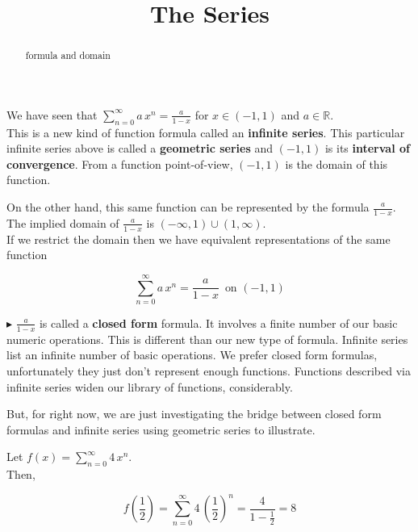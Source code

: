 \documentclass{ximera}
\title{The Series}
\begin{document}
\begin{abstract}
formula and domain
\end{abstract}
\maketitle




We have seen that $\sum\limits_{n=0}^{\infty} a \, x^n = \frac{a}{1-x}$ for $x \in (-1, 1)$ and $a \in \mathbb{R}$. \\




This is a new kind of function formula called an \textbf{\textcolor{purple!85!blue}{infinite series}}.  This particular infinite series above is called a \textbf{\textcolor{purple!85!blue}{geometric series}} and $(-1, 1)$ is its \textbf{\textcolor{purple!85!blue}{interval of convergence}}.  From a function point-of-view, $(-1, 1)$  is the domain of this function.


On the other hand, this same function can be represented by the formula $\frac{a}{1-x}$.  The implied domain of $\frac{a}{1-x}$ is $(-\infty, 1) \cup (1, \infty)$. \\ 


If we restrict the domain then we have equivalent representations of the same function 


\[
\sum\limits_{n=0}^{\infty} a \, x^n   =    \frac{a}{1-x}    \, \text{ on } (-1, 1)
\]



$\blacktriangleright$ $\frac{a}{1-x}$ is called a \textbf{closed form} formula.  It involves a finite number of our basic numeric operations.  This is different than our new type of formula.  Infinite series list an infinite number of basic operations.  We prefer closed form formulas, unfortunately they just don't represent enough functions. Functions described via infinite series widen our library of functions, considerably.

But, for right now, we are just investigating the bridge between closed form formulas and infinite series using geometric series to illustrate.





\begin{example}


Let $f(x) = \sum\limits_{n=0}^{\infty} 4 \, x^n$. \\ 



Then, 


\[ f\left( \frac{1}{2} \right) = \sum\limits_{n=0}^{\infty} 4 \, \left( \frac {1}{2} \right)^n = \frac{4}{1-\frac{1}{2}} = 8
\]

\end{example}
\end{document}
